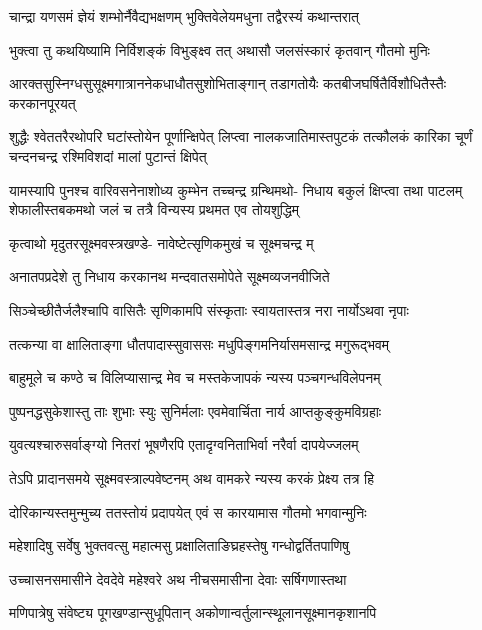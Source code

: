 \twolineshloka
{चान्द्रा यणसमं ज्ञेयं शम्भोर्नैवैद्यभक्षणम्}
{भुक्तिवेलेयमधुना तद्वैरस्यं कथान्तरात्}%

\twolineshloka
{भुक्त्वा तु कथयिष्यामि निर्विशङ्कं विभुङ्क्ष्व तत्}
{अथासौ जलसंस्कारं कृतवान् गौतमो मुनिः}%

\twolineshloka
{आरक्तसुस्निग्धसुसूक्ष्मगात्राननेकधाधौतसुशोभिताङ्गान्}
{तडागतोयैः कतबीजघर्षितैर्विशौधितैस्तैः करकानपूरयत्}%

{शुद्धैः श्वेततरैरथोपरि घटांस्तोयेन पूर्णान्क्षिपेत्}
{लिप्त्वा नालकजातिमास्तपुटकं तत्कौलकं कारिका}
{चूर्णं चन्दनचन्द्र रश्मिविशदां मालां पुटान्तं क्षिपेत्}

\twolineshloka
{यामस्यापि पुनश्च वारिवसनेनाशोध्य कुम्भेन तच्चन्द्र ग्रन्थिमथो-}
{निधाय बकुलं क्षिप्त्वा तथा पाटलम्}%
शेफालीस्तबकमथो जलं च तत्रै
विन्यस्य प्रथमत एव तोयशुद्धिम्

\twolineshloka
{कृत्वाथो मृदुतरसूक्ष्मवस्त्रखण्डे-}
{नावेष्टेत्सृणिकमुखं च सूक्ष्मचन्द्र म्}%

\twolineshloka
{अनातपप्रदेशे तु निधाय करकानथ}
{मन्दवातसमोपेते सूक्ष्मव्यजनवीजिते}%

\twolineshloka
{सिञ्चेच्छीतैर्जलैश्चापि वासितैः सृणिकामपि}
{संस्कृताः स्वायतास्तत्र नरा नार्योऽथवा नृपाः}%

\twolineshloka
{तत्कन्या वा क्षालिताङ्गा धौतपादास्सुवाससः}
{मधुपिङ्गमनिर्यासमसान्द्र मगुरूद्भवम्}%

\twolineshloka
{बाहुमूले च कण्ठे च विलिप्यासान्द्र मेव च}
{मस्तकेजापकं न्यस्य पञ्चगन्धविलेपनम्}%

\twolineshloka
{पुष्पनद्धसुकेशास्तु ताः शुभाः स्युः सुनिर्मलाः}
{एवमेवार्चिता नार्य आप्तकुङ्कुमविग्रहाः}%

\twolineshloka
{युवत्यश्चारुसर्वाङ्ग्यो नितरां भूषणैरपि}
{एतादृग्वनिताभिर्वा नरैर्वा दापयेज्जलम्}%

\twolineshloka
{तेऽपि प्रादानसमये सूक्ष्मवस्त्राल्पवेष्टनम्}
{अथ वामकरे न्यस्य करकं प्रेक्ष्य तत्र हि}%

\twolineshloka
{दोरिकान्यस्तमुन्मुच्य ततस्तोयं प्रदापयेत्}
{एवं स कारयामास गौतमो भगवान्मुनिः}%

\twolineshloka
{महेशादिषु सर्वेषु भुक्तवत्सु महात्मसु}
{प्रक्षालिताङिघ्रहस्तेषु गन्धोद्वर्तितपाणिषु}%

\twolineshloka
{उच्चासनसमासीने देवदेवे महेश्वरे}
{अथ नीचसमासीना देवाः सर्षिगणास्तथा}%

\twolineshloka
{मणिपात्रेषु संवेष्ट्य पूगखण्डान्सुधूपितान्}
{अकोणान्वर्तुलान्स्थूलानसूक्ष्मानकृशानपि}%


